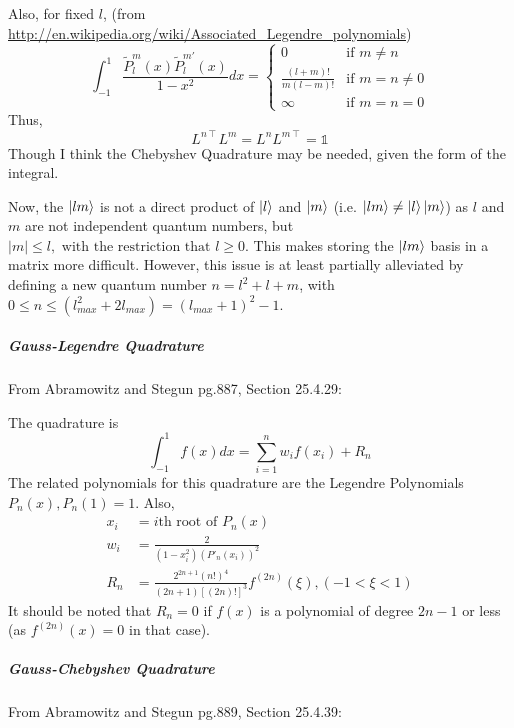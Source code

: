 \documentclass{revtex4-1}
\begin{document}
Also, for fixed $l$, (from \url{http://en.wikipedia.org/wiki/Associated_Legendre_polynomials})
\begin{equation}
\int_{-1}^{1} \frac{\widetilde{P}^{m}_{l}(x) \widetilde{P}^{m'}_{l}(x)}{1-x^{2}}dx = \begin{cases} 0 &\text{if } m \neq n\\
																								\frac{(l+m)!}{m(l-m)!} &\text{if } m = n \neq 0\\
																								\infty &\text{if } m = n = 0
																				   \end{cases}
\end{equation}
Thus,
\begin{equation}
L^{n\intercal}L^{m} = L^{n}L^{m\intercal} = \mathbb{1}
\end{equation}
Though I think the Chebyshev Quadrature may be needed, given the form of the integral.

Now, the $\ket{lm}$ is not a direct product of $\ket{l}$ and $\ket{m}$ (i.e. $\ket{lm} \neq \ket{l}\ket{m}$) as $l$ and $m$ are not independent quantum numbers, but $|m|\leq l, \mbox{ with the restriction that } l\geq 0$. This makes storing the $\ket{lm}$ basis in a matrix more difficult. However, this issue is at least partially alleviated by defining a new quantum number $n = l^{2}+l+m$, with $0 \leq n \leq (l_{max}^{2}+2l_{max}) =(l_{max}+1)^{2}-1$.


\subparagraph{Gauss-Legendre Quadrature}\label{S:gaussLegendreQuad}

From Abramowitz and Stegun pg.887, Section 25.4.29:

The quadrature is
\begin{equation}
\int_{-1}^{1}f(x)dx = \sum_{i=1}^{n}w_{i}f(x_{i}) + R_{n}
\end{equation}
The related polynomials for this quadrature are the Legendre Polynomials $P_{n}(x), P_{n}(1)=1$. Also,
\begin{align}
x_{i} &= i\text{th root of } P_{n}(x)\\
w_{i} &= \frac{2}{(1-x_{i}^{2})(P'_{n}(x_{i}))^{2}}\\
R_{n} &= \frac{2^{2n+1}(n!)^{4}}{(2n+1)[(2n)!]^{3}}f^{(2n)}(\xi), (-1<\xi<1)
\end{align}
It should be noted that $R_{n} = 0$ if $f(x)$ is a polynomial of degree $2n-1$ or less (as $f^{(2n)}(x) = 0$ in that case).

\subparagraph{Gauss-Chebyshev Quadrature}\label{S:gaussChebyshevQuad}

From Abramowitz and Stegun pg.889, Section 25.4.39:
\end{document}
